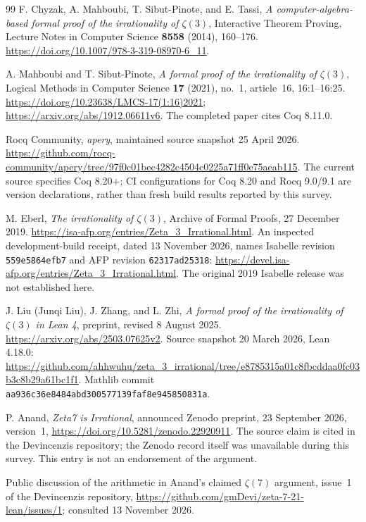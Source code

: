 \documentclass[11pt,letterpaper]{article}
\theoremstyle{definition}
\begin{document}
\begin{thebibliography}{99}
F. Chyzak, A. Mahboubi, T. Sibut-Pinote, and E. Tassi,
\emph{A computer-algebra-based formal proof of the irrationality of
$\zeta(3)$}, Interactive Theorem Proving, Lecture Notes in Computer
Science \textbf{8558} (2014), 160--176.
\url{https://doi.org/10.1007/978-3-319-08970-6_11}.

A. Mahboubi and T. Sibut-Pinote, \emph{A formal proof of the
irrationality of $\zeta(3)$}, Logical Methods in Computer Science
\textbf{17} (2021), no.~1, article~16, 16:1--16:25.
\url{https://doi.org/10.23638/LMCS-17(1:16)2021};
\url{https://arxiv.org/abs/1912.06611v6}.
The completed paper cites Coq 8.11.0.

Rocq Community, \emph{apery}, maintained source snapshot
25 April 2026.
\url{https://github.com/rocq-community/apery/tree/97f0c01bec4282c4504c0225a71ff0e75aeab115}.
The current source specifies Coq 8.20+; CI configurations for Coq 8.20
and Rocq 9.0/9.1 are version declarations, rather than fresh build results
reported by this survey.

M. Eberl, \emph{The irrationality of $\zeta(3)$}, Archive of Formal
Proofs, 27 December 2019.
\url{https://isa-afp.org/entries/Zeta_3_Irrational.html}.
An inspected development-build receipt, dated 13 November 2026, names
Isabelle revision \texttt{559e5864efb7} and AFP revision
\texttt{62317ad25318}:
\url{https://devel.isa-afp.org/entries/Zeta_3_Irrational.html}.
The original 2019 Isabelle release was not established here.

J. Liu (Junqi Liu), J. Zhang, and L. Zhi, \emph{A formal proof of the
irrationality of $\zeta(3)$ in Lean 4}, preprint, revised 8 August 2025.
\url{https://arxiv.org/abs/2503.07625v2}.
Source snapshot 20 March 2026, Lean 4.18.0:
\url{https://github.com/ahhwuhu/zeta_3_irrational/tree/e8785315a01c8fbcddaa0fc03b3c8b29a61bc1f1}.
Mathlib commit \texttt{aa936c36e8484abd300577139faf8e945850831a}.

P. Anand, \emph{Zeta7 is Irrational}, announced Zenodo preprint,
23 September 2026, version~1,
\url{https://doi.org/10.5281/zenodo.22920911}.
The source claim is cited in the Devincenzis repository; the Zenodo
record itself was unavailable during this survey.  This entry is not
an endorsement of the argument.

Public discussion of the arithmetic in Anand's claimed $\zeta(7)$
argument, issue~1 of the Devincenzis repository,
\url{https://github.com/gmDevi/zeta-7-21-lean/issues/1}; consulted
13 November 2026.


\end{thebibliography}
\end{document}
